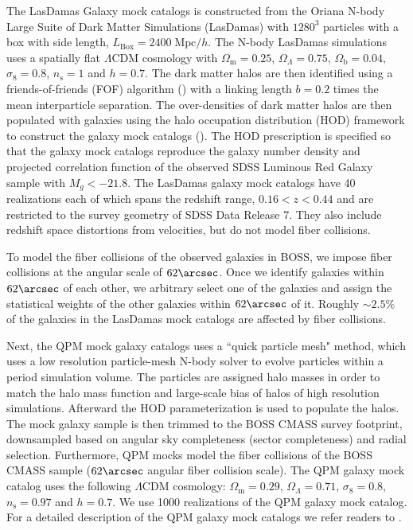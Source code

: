 \documentclass{emulateapj}
\begin{document}
The LasDamas Galaxy mock catalogs is constructed from the Oriana N-body Large Suite of Dark Matter Simulations (LasDamas) with $1280^3$ particles with a box with side length, $L_\mathrm{Box} = 2400\;\mathrm{Mpc}/h$. The N-body LasDamas simulations uses a spatially flat $\Lambda$CDM cosmology with $\Omega_\mathrm{m} = 0.25$, $\Omega_\Lambda = 0.75$, $\Omega_\mathrm{b} = 0.04$, $\sigma_8 = 0.8$, $n_\mathrm{s} = 1$ and $h=0.7$. The dark matter halos are then identified using a friends-of-friends (FOF) algorithm (\citealt{Davis:1985aa}) with a linking length $b = 0.2 $ times the mean interparticle separation. The over-densities of dark matter halos are then populated with galaxies using the halo occupation distribution (HOD) framework to construct the galaxy mock catalogs (\citealt{McBride:2009aa, McBride:2011aa}). The HOD prescription is specified so that the galaxy mock catalogs reproduce the galaxy number density and projected correlation function of the observed SDSS Luminous Red Galaxy sample with $M_g < -21.8$. The LasDamas galaxy mock catalogs have 40 realizations each of which spans the redshift range, $0.16 < z < 0.44$ and are restricted to the survey geometry of SDSS Data Release 7. They also include redshift space distortions from velocities, but do not model fiber collisions. 

To model the fiber collisions of the observed galaxies in BOSS, we impose fiber collisions at the angular scale of $62\arcsec$. Once we identify galaxies within $62\arcsec$ of each other, we arbitrary select one of the galaxies and assign the statistical weights of the other galaxies within $62\arcsec$ of it. Roughly $\sim 2.5 \%$ of the galaxies in the LasDamas mock catalogs are affected by fiber collisions. 

Next, the QPM mock galaxy catalogs uses a ``quick particle mesh" method, which uses a low resolution particle-mesh N-body solver to evolve particles within a period simulation volume. The particles are assigned halo masses  in order to match the halo mass function and large-scale bias of halos of high resolution simulations. Afterward the \cite{Tinker:2012aa} HOD parameterization is used to populate the halos. The mock galaxy sample is then trimmed to the BOSS CMASS survey footprint, downsampled based on angular sky completeness (sector completeness) and radial selection. Furthermore, QPM mocks model the fiber collisions of the BOSS CMASS sample ($62\arcsec$ angular fiber collision scale). The QPM galaxy mock catalog uses the following $\Lambda$CDM cosmology: $\Omega_\mathrm{m} = 0.29$, $\Omega_\Lambda = 0.71$, $\sigma_8 = 0.8$, $n_\mathrm{s} = 0.97$ and $h=0.7$. We use 1000 realizations of the QPM galaxy mock catalog. For a detailed description of the QPM galaxy mock catalogs we refer readers to \cite{White:2014aa}. 
\end{document}
